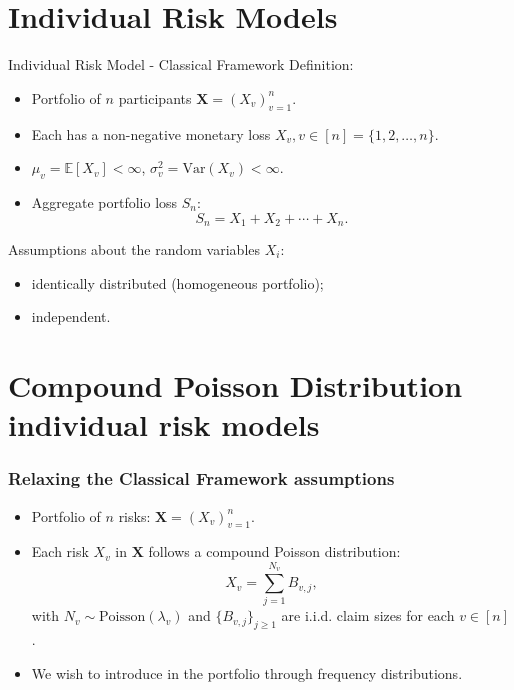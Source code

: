 \documentclass[11pt,xcolor={dvipsnames},hyperref={pdftex,pdfpagemode=UseNone,hidelinks,pdfdisplaydoctitle=true},usepdftitle=false]{beamer}
\begin{document}
\section{Individual Risk Models}
\begin{frame}{Individual Risk Model - Classical Framework}
Definition: 
\begin{itemize}
    \item Portfolio of $n$ participants $\boldsymbol{X} = (X_v)_{v=1}^{n}$.
    \item Each has a non-negative monetary loss $X_v, v \in [n] = \{1,2, \dots, n\}$.
    \item $\mu_v = \mathbb{E}[X_v] < \infty$, $\sigma_v^2 = \mathrm{Var}(X_v) < \infty$.
    \item Aggregate portfolio loss $S_n$:  
    \begin{equation*}
    S_n = X_1 + X_2 + \cdots + X_n.
    \end{equation*}
\end{itemize}
\vfill

\pause

Assumptions about the random variables $X_i$: 
\begin{itemize}
    \item identically distributed (homogeneous portfolio);
    \item independent. 
\end{itemize}
\end{frame}

\section{Compound Poisson Distribution individual risk models}
\begin{frame}
\frametitle{Relaxing the Classical Framework assumptions}
\begin{itemize}
    \item Portfolio of $n$  risks: $\boldsymbol{X} = (X_v)_{v=1}^{n}$.

    \vfill

    \item Each risk $X_v$ in $\boldsymbol{X}$ follows a compound Poisson distribution: 
        \begin{equation*}
        X_v = \sum_{j=1}^{N_v} B_{v,j},
        \end{equation*}
        with $N_v \sim \text{Poisson}(\lambda_v)$ and $ \{B_{v,j}\}_{j \ge 1}$ are i.i.d. claim sizes for each $v \in [n]$.
        \pause

        \vfill

    \item We wish to introduce  in the portfolio through frequency distributions.
\end{itemize}

\end{frame}
\end{document}
